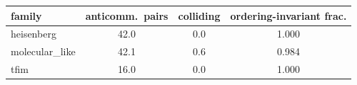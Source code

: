 \begin{tabular}{lccc}
\toprule
family & anticomm.\ pairs & colliding & ordering-invariant frac. \\
\midrule
heisenberg & 42.0 & 0.0 & 1.000 \\
molecular\_like & 42.1 & 0.6 & 0.984 \\
tfim & 16.0 & 0.0 & 1.000 \\
\bottomrule
\end{tabular}
